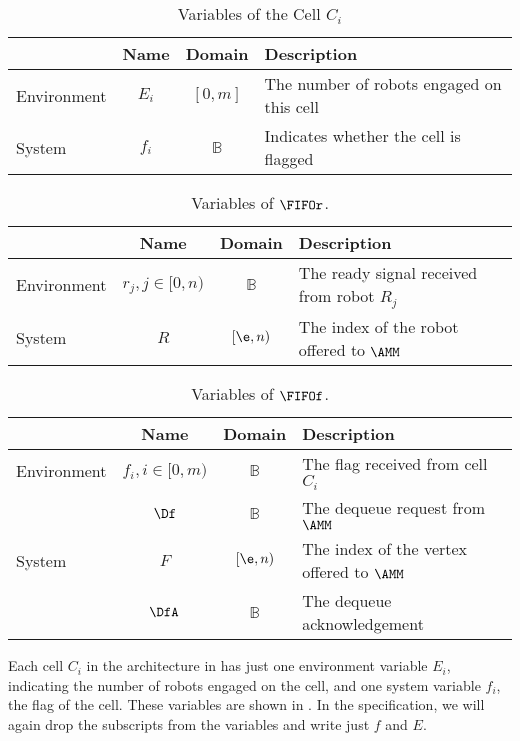 \begin{table}
\centering
\begin{tabular}{l|c|c|l}
\hline
& Name & Domain & Description \\
\hline
Environment & $E_i$ & $[0, m]$ & The number of robots engaged on this cell \\
\hline
System & $f_i$ & $\mathbb{B}$ & Indicates whether the cell is flagged \\
\hline
\end{tabular}
\caption{Variables of the Cell $C_i$}
\label{tab:cellvars}
\end{table}

\begin{table}
\centering
\begin{tabular}{l|c|c|l}
\hline
& Name & Domain & Description \\
\hline
Environment & $r_j, j \in [0, n)$ & $\mathbb{B}$ & The ready signal received from robot $R_j$ \\
\hline
System & $R$ & $[\e, n)$ & The index of the robot offered to $\AMM$\\
\hline
\end{tabular}
\caption{Variables of $\FIFOr$.}
\label{tab:fiforvars}
\end{table}

\begin{table}
\centering
\begin{tabular}{l|c|c|l}
\hline
& Name & Domain & Description \\
\hline
Environment & $f_i, i \in [0, m)$ & $\mathbb{B}$ & The flag received from cell $C_i$\\
            & $\Df$ & $\mathbb{B}$ & The dequeue request from $\AMM$\\
\hline
System & $F$ & $[\e, n)$ & The index of the vertex offered to $\AMM$\\
       & $\DfA$ & $\mathbb{B}$ & The dequeue acknowledgement \\
\hline
\end{tabular}
\caption{Variables of $\FIFOf$.}
\label{tab:fifofvars}
\end{table}

Each cell $C_i$ in the architecture in  has just one environment variable $E_i$, indicating the number of robots engaged on the cell, and one system variable $f_i$, the flag of the cell. These variables are shown in . In the specification, we will again drop the subscripts from the variables and write just $f$ and $E$.\\

